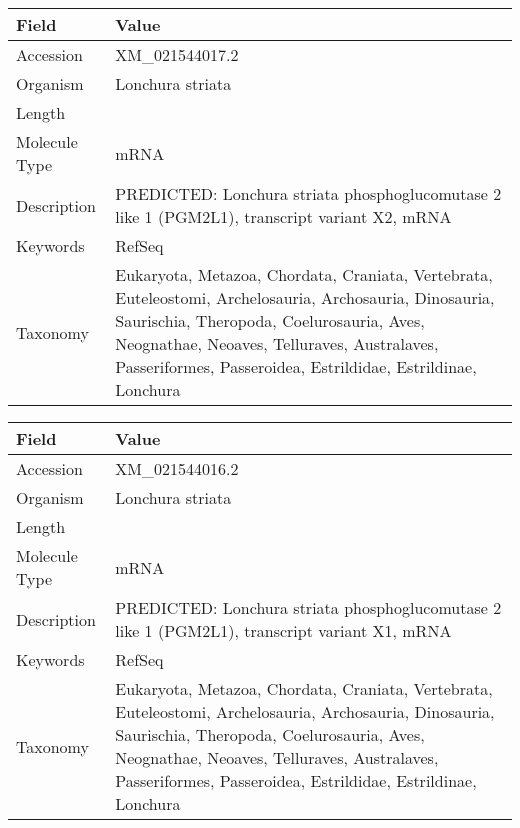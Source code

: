 \documentclass[10pt]{article}
\begin{document}
\vspace{1em}
{\footnotesize
\begin{longtable}{>{\raggedright\arraybackslash}p{4.5cm} >{\raggedright\arraybackslash}p{11.5cm}}
\textbf{Field} & \textbf{Value} \\
\hline
Accession & XM\_021544017.2 \\
Organism & Lonchura striata \\
Length & 5980 \\
Molecule Type & mRNA \\
Description & PREDICTED: Lonchura striata phosphoglucomutase 2 like 1 (PGM2L1), transcript variant X2, mRNA \\
Keywords & RefSeq \\
Taxonomy & Eukaryota, Metazoa, Chordata, Craniata, Vertebrata, Euteleostomi, Archelosauria, Archosauria, Dinosauria, Saurischia, Theropoda, Coelurosauria, Aves, Neognathae, Neoaves, Telluraves, Australaves, Passeriformes, Passeroidea, Estrildidae, Estrildinae, Lonchura \\
\end{longtable}
}

\vspace{1em}
{\footnotesize
\begin{longtable}{>{\raggedright\arraybackslash}p{4.5cm} >{\raggedright\arraybackslash}p{11.5cm}}
\textbf{Field} & \textbf{Value} \\
\hline
Accession & XM\_021544016.2 \\
Organism & Lonchura striata \\
Length & 6016 \\
Molecule Type & mRNA \\
Description & PREDICTED: Lonchura striata phosphoglucomutase 2 like 1 (PGM2L1), transcript variant X1, mRNA \\
Keywords & RefSeq \\
Taxonomy & Eukaryota, Metazoa, Chordata, Craniata, Vertebrata, Euteleostomi, Archelosauria, Archosauria, Dinosauria, Saurischia, Theropoda, Coelurosauria, Aves, Neognathae, Neoaves, Telluraves, Australaves, Passeriformes, Passeroidea, Estrildidae, Estrildinae, Lonchura \\
\end{longtable}
}
\end{document}
